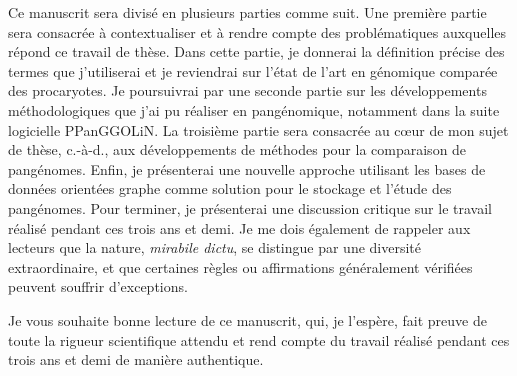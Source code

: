 
Ce manuscrit sera divisé en plusieurs parties comme suit. Une première partie sera consacrée à contextualiser et à rendre compte des problématiques auxquelles répond ce travail de thèse. Dans cette partie, je donnerai la définition précise des termes que j'utiliserai et je reviendrai sur l'état de l'art en génomique comparée des procaryotes. Je poursuivrai par une seconde partie sur les développements méthodologiques que j'ai pu réaliser en pangénomique, notamment dans la suite logicielle PPanGGOLiN. La troisième partie sera consacrée au c{\oe}ur de mon sujet de thèse, c.-à-d., aux développements de méthodes pour la comparaison de pangénomes. Enfin, je présenterai une nouvelle approche utilisant les bases de données orientées graphe comme solution pour le stockage et l'étude des pangénomes. Pour terminer, je présenterai une discussion critique sur le travail réalisé pendant ces trois ans et demi. Je me dois également de rappeler aux lecteurs que la nature, \textit{mirabile dictu}, se distingue par une diversité extraordinaire, et que certaines règles ou affirmations généralement vérifiées peuvent souffrir d'exceptions.
\newline

Je vous souhaite bonne lecture de ce manuscrit, qui, je l'espère, fait preuve de toute la rigueur scientifique attendu et rend compte du travail réalisé pendant ces trois ans et demi de manière authentique.
